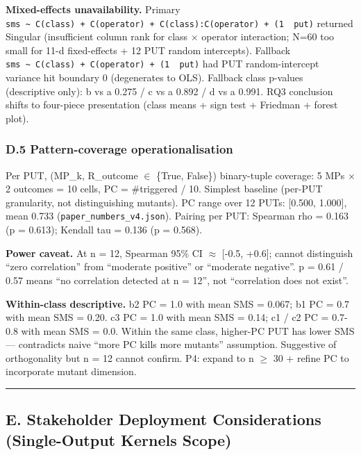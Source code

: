 \documentclass[review,12pt,authoryear]{elsarticle}
\begin{document}
\textbf{Mixed-effects unavailability.} Primary
\texttt{sms\ \textasciitilde{}\ C(class)\ +\ C(operator)\ +\ C(class):C(operator)\ +\ (1\ \textbar{}\ put)}
returned Singular (insufficient column rank for class $\times$ operator
interaction; N=60 too small for 11-d fixed-effects + 12 PUT random
intercepts). Fallback
\texttt{sms\ \textasciitilde{}\ C(class)\ +\ C(operator)\ +\ (1\ \textbar{}\ put)}
had PUT random-intercept variance hit boundary 0 (degenerates to OLS).
Fallback class p-values (descriptive only): b vs a 0.275 / c vs a 0.892
/ d vs a 0.991. RQ3 conclusion shifts to four-piece presentation (class
means + sign test + Friedman + forest plot).

\subsubsection{D.5 Pattern-coverage
operationalisation}\label{d.5-pattern-coverage-operationalisation}

Per PUT, (MP\_k, R\_outcome $\in$ \{True, False\}) binary-tuple coverage: 5
MPs $\times$ 2 outcomes = 10 cells, PC = \#triggered / 10. Simplest baseline
(per-PUT granularity, not distinguishing mutants). PC range over 12
PUTs: {[}0.500, 1.000{]}, mean 0.733 (\texttt{paper\_numbers\_v4.json}).
Pairing per PUT: Spearman rho = 0.163 (p = 0.613); Kendall tau = 0.136
(p = 0.568).

\textbf{Power caveat.} At n = 12, Spearman 95\% CI $\approx$ {[}-0.5, +0.6{]};
cannot distinguish ``zero correlation'' from ``moderate positive'' or
``moderate negative''. p = 0.61 / 0.57 means ``no correlation detected
at n = 12'', not ``correlation does not exist''.

\textbf{Within-class descriptive.} b2 PC = 1.0 with mean SMS = 0.067; b1
PC = 0.7 with mean SMS = 0.20. c3 PC = 1.0 with mean SMS = 0.14; c1 / c2
PC = 0.7-0.8 with mean SMS = 0.0. Within the same class, higher-PC PUT
has lower SMS --- contradicts naive ``more PC kills more mutants''
assumption. Suggestive of orthogonality but n = 12 cannot confirm. P4:
expand to n $\geq$ 30 + refine PC to incorporate mutant dimension.

\begin{center}\rule{0.5\linewidth}{0.5pt}\end{center}

\subsection{E. Stakeholder Deployment Considerations (Single-Output
Kernels
Scope)}\label{e.-stakeholder-deployment-considerations-single-output-kernels-scope}
\end{document}
